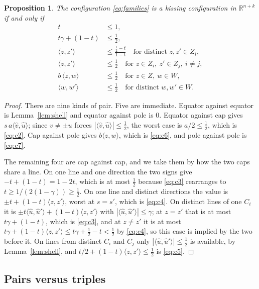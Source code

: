 \documentclass[11pt]{amsart}
\newtheorem{proposition}[theorem]{Proposition}
\theoremstyle{remark}
\newcommand{\ip}[2]{\langle #1,#2\rangle}
\newcommand{\R}{\mathbb{R}}
\begin{document}
\begin{proposition}\label{prop:cap}
The configuration \eqref{eq:families} is a kissing configuration in
$\R^{n+k}$ if and only if
\begin{align}
  t &\le 1, \label{eq:c2}\\
  t\gamma+(1-t) &\le \tfrac12, \label{eq:c3}\\
  \ip{z}{z'} &\le \frac{\tfrac12-t}{1-t}
     \quad\text{for distinct } z,z'\in Z_i, \label{eq:c4}\\
  \ip{z}{z'} &\le \tfrac12
     \quad\text{for } z\in Z_i,\ z'\in Z_j,\ i\ne j, \label{eq:c5}\\
  b\,\ip{z}{w} &\le \tfrac12
     \quad\text{for } z\in Z,\ w\in W, \label{eq:c6}\\
  \ip{w}{w'} &\le \tfrac12
     \quad\text{for distinct } w,w'\in W. \label{eq:c7}
\end{align}
\end{proposition}

\begin{proof}
There are nine kinds of pair. Five are immediate. Equator against equator is
Lemma~\ref{lem:shell} and equator against pole is $0$. Equator against cap gives
$s\,a\ip{\hat v}{\hat u}$; since $v\ne\pm u$ forces
$|\ip{\hat v}{\hat u}|\le\tfrac12$, the worst case is $a/2\le\tfrac12$, which is
\eqref{eq:c2}. Cap against pole gives $b\ip{z}{w}$, which is \eqref{eq:c6}, and
pole against pole is \eqref{eq:c7}.

The remaining four are cap against cap, and we take them by how the two caps
share a line. On one line and one direction the two signs give
$-t+(1-t)=1-2t$, which is at most $\tfrac12$ because \eqref{eq:c3} rearranges to
$t\ge1/(2(1-\gamma))\ge\tfrac12$. On one line and distinct directions the value
is $\pm t+(1-t)\ip{z}{z'}$, worst at $s=s'$, which is \eqref{eq:c4}. On distinct
lines of one $C_i$ it is $\pm t\ip{\hat u}{\hat u'}+(1-t)\ip{z}{z'}$ with
$|\ip{\hat u}{\hat u'}|\le\gamma$; at $z=z'$ that is at most $t\gamma+(1-t)$,
which is \eqref{eq:c3}, and at $z\ne z'$ it is at most
$t\gamma+(1-t)\ip{z}{z'}\le t\gamma+\tfrac12-t<\tfrac12$ by \eqref{eq:c4}, so
this case is implied by the two before it. On lines from distinct $C_i$ and
$C_j$ only $|\ip{\hat u}{\hat u'}|\le\tfrac12$ is available, by
Lemma~\ref{lem:shell}, and $t/2+(1-t)\ip{z}{z'}\le\tfrac12$ is \eqref{eq:c5}.
\end{proof}

\subsection{Pairs versus triples}\label{ss:pairs}
\end{document}
